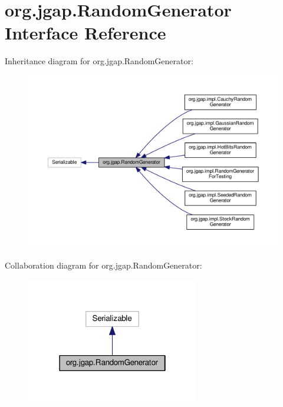 \hypertarget{interfaceorg_1_1jgap_1_1_random_generator}{\section{org.\-jgap.\-Random\-Generator Interface Reference}
\label{interfaceorg_1_1jgap_1_1_random_generator}
}


Inheritance diagram for org.\-jgap.\-Random\-Generator\-:
\nopagebreak
\begin{figure}[H]
\begin{center}
\leavevmode
\includegraphics[width=350pt]{interfaceorg_1_1jgap_1_1_random_generator__inherit__graph}
\end{center}
\end{figure}


Collaboration diagram for org.\-jgap.\-Random\-Generator\-:
\nopagebreak
\begin{figure}[H]
\begin{center}
\leavevmode
\includegraphics[width=214pt]{interfaceorg_1_1jgap_1_1_random_generator__coll__graph}
\end{center}
\end{figure}
